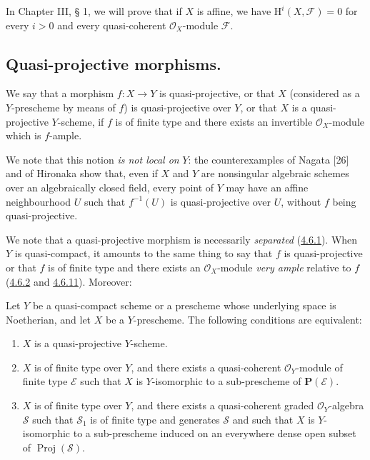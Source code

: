 \begin{remark}[5.2.4]
\label{II.5.2.4}
In Chapter III, § 1, we will prove that if $X$ is affine, we have
$\mathrm{H}^i(X,\mathcal{F})=0$ for every $i>0$ and every quasi-coherent
$\mathcal{O}_X$-module $\mathcal{F}$.
\end{remark}

\subsection{Quasi-projective morphisms.}
\label{subsection:II.5.3}

\begin{definition}[5.3.1]
\label{II.5.3.1}
We say that a morphism $f:X\to Y$ is quasi-projective, or that $X$
(considered as a $Y$-prescheme by means of $f$) is quasi-projective
over $Y$, or that $X$ is a quasi-projective $Y$-scheme, if $f$ is of
finite type and there exists an invertible $\mathcal{O}_X$-module which is
$f$-ample.
\end{definition}

We note that this notion \emph{is not local on} $Y$: the counterexamples of
Nagata [26] and of Hironaka show that, even if $X$ and $Y$ are nonsingular
algebraic schemes over an algebraically closed field, every point of
$Y$ may have an affine neighbourhood $U$ such that $f^{-1}(U)$ is
quasi-projective over $U$, without $f$ being quasi-projective.

We note that a quasi-projective morphism is necessarily \emph{separated}
(\hyperref[II.4.6.1]{4.6.1}). When $Y$ is quasi-compact, it amounts to
the same thing to say that $f$ is quasi-projective or that $f$ is of finite
type and there exists an $\mathcal{O}_X$-module \emph{very ample} relative to $f$
(\hyperref[II.4.6.2]{4.6.2} and \hyperref[II.4.6.11]{4.6.11}). Moreover:

\begin{proposition}[5.3.2]
\label{II.5.3.2}
Let $Y$ be a quasi-compact scheme or a prescheme whose underlying space
is Noetherian, and let $X$ be a $Y$-prescheme. The following conditions are
equivalent:
\begin{enumerate}
  \item[\rm{a)}] $X$ is a quasi-projective $Y$-scheme.
  \item[\rm{b)}] $X$ is of finite type over $Y$, and there exists a
  quasi-coherent $\mathcal{O}_Y$-module of finite type $\mathcal{E}$ such that
  $X$ is $Y$-isomorphic to a sub-prescheme of $\mathbf{P}(\mathcal{E})$.
  \item[\rm{c)}] $X$ is of finite type over $Y$, and there exists a
  quasi-coherent graded $\mathcal{O}_Y$-algebra $\mathcal{S}$ such that
  $\mathcal{S}_1$ is of finite type and generates $\mathcal{S}$ and such that
  $X$ is $Y$-isomorphic to a sub-prescheme induced on an everywhere dense
  open subset of $\operatorname{Proj}(\mathcal{S})$.
\end{enumerate}
\end{proposition}

